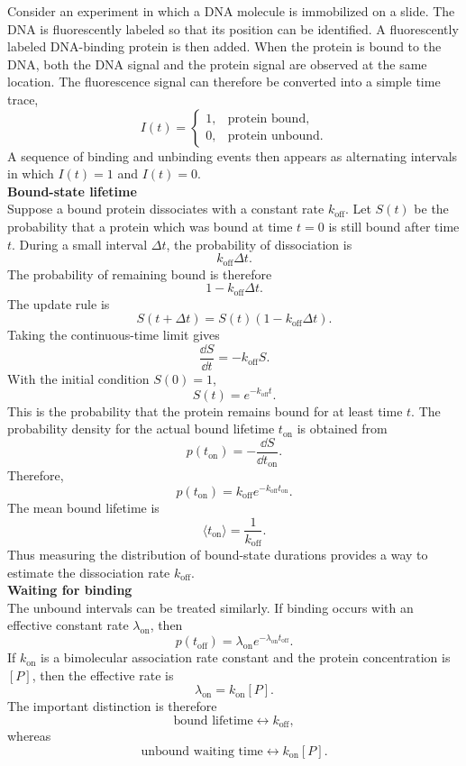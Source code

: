 Consider an experiment in which a DNA molecule is immobilized on a slide.
The DNA is fluorescently labeled so that its position can be identified.
A fluorescently labeled DNA-binding protein is then added.
When the protein is bound to the DNA, both the DNA signal and the protein signal are observed at the same location.
The fluorescence signal can therefore be converted into a simple time trace,
\[
    I(t) =
    \begin{cases}
        1, & \text{protein bound}, \\
        0, & \text{protein unbound}.
    \end{cases}
\]
A sequence of binding and unbinding events then appears as alternating intervals in which $I(t)=1$ and $I(t)=0$.
% 
\medskip
\\
\textbf{Bound-state lifetime}
\\
Suppose a bound protein dissociates with a constant rate $k_{\mathrm{off}}$.
Let $S(t)$ be the probability that a protein which was bound at time $t=0$ is still bound after time $t$.
During a small interval $\Delta t$, the probability of dissociation is
% 
\[
    k_{\mathrm{off}}\Delta t.
\]
% 
The probability of remaining bound is therefore
% 
\[
    1-k_{\mathrm{off}}\Delta t.
\]
% 
The update rule is
% 
\[
    S(t+\Delta t)=S(t)\left(1-k_{\mathrm{off}}\Delta t\right).
\]
% 
Taking the continuous-time limit gives
% 
\[
    \frac{\dd S}{\dd t}=-k_{\mathrm{off}}S.
\]
% 
With the initial condition $S(0)=1$,
% 
\[
    \boxed{S(t)=e^{-k_{\mathrm{off}}t}.}
\]
% 
This is the probability that the protein remains bound for at least time $t$.
The probability density for the actual bound lifetime $t_{\mathrm{on}}$ is obtained from
% 
\[
    p(t_{\mathrm{on}})=-\frac{\dd S}{\dd t_{\mathrm{on}}}.
\]
% 
Therefore,
% 
\[
    \boxed{
        p(t_{\mathrm{on}})=k_{\mathrm{off}}e^{-k_{\mathrm{off}}t_{\mathrm{on}}}.
        }
\]
% 
The mean bound lifetime is
% 
\[
    \langle t_{\mathrm{on}}\rangle = \frac{1}{k_{\mathrm{off}}}.
\]
% 
Thus measuring the distribution of bound-state durations provides a way to estimate the dissociation rate $k_{\mathrm{off}}$.
% 
\medskip
\\
\textbf{Waiting for binding}
\\
The unbound intervals can be treated similarly.
If binding occurs with an effective constant rate $\lambda_{\mathrm{on}}$, then
% 
\[
    p(t_{\mathrm{off}})=\lambda_{\mathrm{on}}e^{-\lambda_{\mathrm{on}}t_{\mathrm{off}}}.
\]
% 
If $k_{\mathrm{on}}$ is a bimolecular association rate constant and the protein concentration is $[P]$, then the effective rate is
% 
\[
    \lambda_{\mathrm{on}}=k_{\mathrm{on}}[P].
\]
% 
The important distinction is therefore
% 
\[
    \text{bound lifetime} \longleftrightarrow k_{\mathrm{off}},
\]
% 
whereas
% 
\[
    \text{unbound waiting time} \longleftrightarrow k_{\mathrm{on}}[P].
\]

